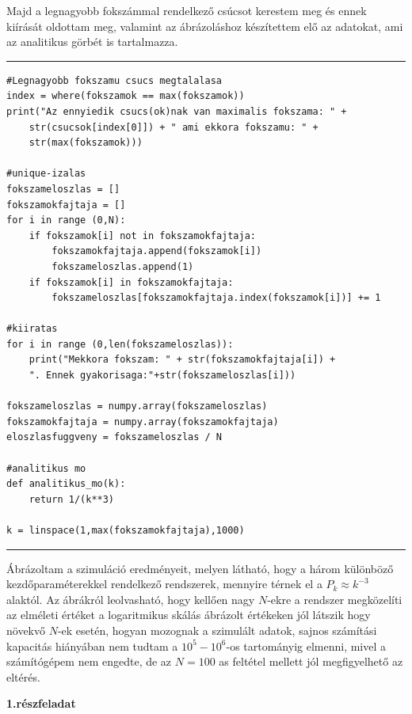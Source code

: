 \documentclass[a4paper, 12pt]{article}
\numberwithin{equation}{section}          %
\numberwithin{figure}{subsection}
\begin{document}
Majd a legnagyobb fokszámmal rendelkező csúcsot kerestem meg és ennek kiírását oldottam meg, valamint az ábrázoláshoz készítettem elő az adatokat, ami az analitikus görbét is tartalmazza.
\newline
\rule{\textwidth}{0.1pt}
\begin{lstlisting}
#Legnagyobb fokszamu csucs megtalalasa
index = where(fokszamok == max(fokszamok))
print("Az ennyiedik csucs(ok)nak van maximalis fokszama: " +
	str(csucsok[index[0]]) + " ami ekkora fokszamu: " + 
	str(max(fokszamok)))

#unique-izalas
fokszameloszlas = []
fokszamokfajtaja = []
for i in range (0,N):
	if fokszamok[i] not in fokszamokfajtaja:
		fokszamokfajtaja.append(fokszamok[i])
		fokszameloszlas.append(1)
	if fokszamok[i] in fokszamokfajtaja:
		fokszameloszlas[fokszamokfajtaja.index(fokszamok[i])] += 1

#kiiratas
for i in range (0,len(fokszameloszlas)):
	print("Mekkora fokszam: " + str(fokszamokfajtaja[i]) + 
	". Ennek gyakorisaga:"+str(fokszameloszlas[i]))

fokszameloszlas = numpy.array(fokszameloszlas)
fokszamokfajtaja = numpy.array(fokszamokfajtaja)
eloszlasfuggveny = fokszameloszlas / N

#analitikus mo
def analitikus_mo(k):
	return 1/(k**3)

k = linspace(1,max(fokszamokfajtaja),1000)

\end{lstlisting}
\rule{\textwidth}{0.1pt}


\clearpage

Ábrázoltam a szimuláció eredményeit, melyen látható, hogy a három különböző kezdőparaméterekkel rendelkező rendszerek, mennyire térnek el a $P_k \approx k^{-3}$ alaktól.
Az ábrákról leolvasható, hogy kellően nagy $N$-ekre a rendszer  megközelíti az elméleti értéket  a logaritmikus skálás ábrázolt értékeken jól látszik hogy növekvő $N$-ek esetén, hogyan mozognak a szimulált adatok, sajnos számítási kapacitás hiányában nem tudtam a $10^5-10^6$-os tartományig elmenni, mivel a számítógépem nem engedte, de az $N=100$ as feltétel mellett jól megfigyelhető az eltérés.

\textbf{1.részfeladat}\newline
\end{document}
